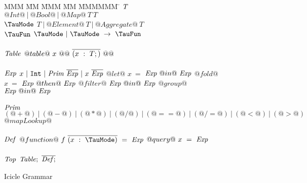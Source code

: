 
\begin{figure}

\begin{tabbing}
MMM \= MM \= MMM \= MM \= MMMMMM \= \kill
$\mathit{T}$
\GrammarDef
  $@Int@~|~@Bool@~|~@Map@~T~T$
\\
$\mi{\TauMode}$
\GrammarDef
  $T~|~@Element@~T~|~@Aggregate@~T$
\\
$\mi{\TauFun}$
\GrammarDef
  $\TauMode ~|~ \TauMode~\to~\TauFun$
\\
\\

$\mathit{Table}$
\GrammarDef
  $@table@~x~@{@~\overline{(x~:~T;)}~@}@$
\\
\\

$\mathit{Exp}$
\GrammarDef
  $x~|~\mathtt{Int}~|~\mathit{Prim}~\overline{\mathit{Exp}}~|~x~\overline{\mathit{Exp}}$
\GrammarAlt
  $@let@$   \> $x~=$ \> $\mathit{Exp}~@  in@~\mathit{Exp}$
\GrammarAlt
  $@fold@$  \> $x~=$ \> $\mathit{Exp}~@then@~\mathit{Exp}$
\GrammarAlt
  $@filter@$\> \> $\mathit{Exp}~@  in@~\mathit{Exp}$
\GrammarAlt
  $@group@$ \> \> $\mathit{Exp}~@  in@~\mathit{Exp}$
\\
\\

$\mathit{Prim}$
\GrammarDef
  $(@+@)~|~(@-@)~|~(@*@)~|~(@/@)~|~(@==@)~|~(@/=@)~|~(@<@)~|~(@>@)$
\GrammarAlt
  $@mapLookup@$
\\
\\


$\mathit{Def}$
\GrammarDef
  $@function@~f~\ov{(x~:~\TauMode)}~=~\mi{Exp}$
\GrammarAlt
  $@query@~x~=~\mathit{Exp}$
\\
\\
$\mathit{Top}$
\GrammarDef
  $\mathit{Table};~\overline{\mathit{Def};}$
\end{tabbing}

\caption{Icicle Grammar}
\label{fig:source:grammar}
\end{figure}

